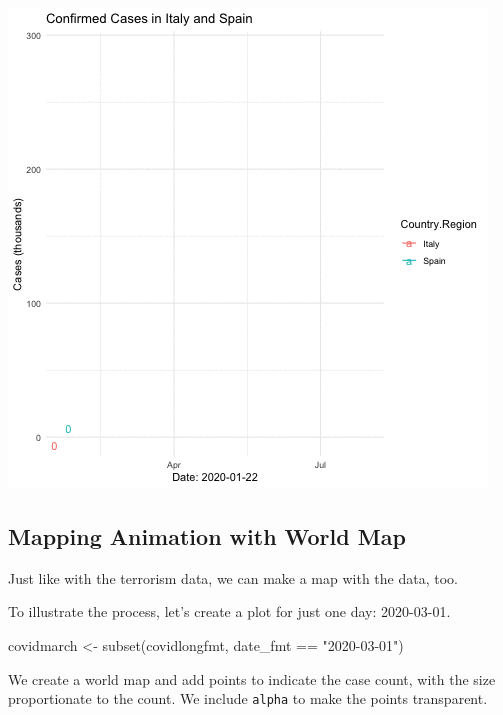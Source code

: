 \documentclass[
  letterpaper,
  DIV=11,
  numbers=noendperiod]{scrreprt}
\newenvironment{Shaded}{\begin{snugshade}}{\end{snugshade}}
\newcommand{\FunctionTok}[1]{\textcolor[rgb]{0.28,0.35,0.67}{#1}}
\newcommand{\NormalTok}[1]{\textcolor[rgb]{0.00,0.23,0.31}{#1}}
\newcommand{\OtherTok}[1]{\textcolor[rgb]{0.00,0.23,0.31}{#1}}
\newcommand{\SpecialCharTok}[1]{\textcolor[rgb]{0.37,0.37,0.37}{#1}}
\newcommand{\StringTok}[1]{\textcolor[rgb]{0.13,0.47,0.30}{#1}}
\begin{document}
\includegraphics{images/italyspain.gif}

\hypertarget{mapping-animation-with-world-map}{%
\subsection{Mapping Animation with World
Map}\label{mapping-animation-with-world-map}}

Just like with the terrorism data, we can make a map with the data, too.

To illustrate the process, let's create a plot for just one day:
2020-03-01.

\begin{Shaded}
\begin{Highlighting}[]
\NormalTok{covidmarch }\OtherTok{\textless{}{-}} \FunctionTok{subset}\NormalTok{(covidlongfmt, date\_fmt }\SpecialCharTok{==} \StringTok{"2020{-}03{-}01"}\NormalTok{)}
\end{Highlighting}
\end{Shaded}

We create a world map and add points to indicate the case count, with
the size proportionate to the count. We include \texttt{alpha} to make
the points transparent.
\end{document}
